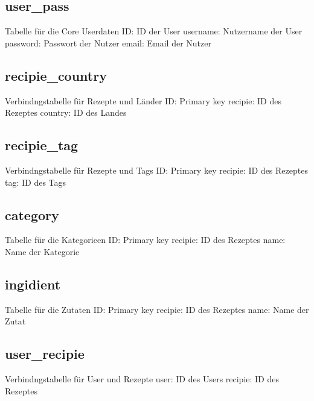 \documentclass{article}
\begin{document}
\subsection{user\_pass}
Tabelle für die Core Userdaten
\newline
ID: ID der User
\newline
username: Nutzername der User
\newline
password: Passwort der Nutzer
\newline
email: Email der Nutzer

\subsection{recipie\_country}
Verbindngstabelle für Rezepte und Länder
\newline
ID: Primary key
\newline
recipie: ID des Rezeptes
\newline
country: ID des Landes

\subsection{recipie\_tag}
Verbindngstabelle für Rezepte und Tags
\newline
ID: Primary key
\newline
recipie: ID des Rezeptes
\newline
tag: ID des Tags

\subsection{category}
Tabelle für die Kategorieen
\newline
ID: Primary key
\newline
recipie: ID des Rezeptes
\newline
name: Name der Kategorie

\subsection{ingidient}
Tabelle für die Zutaten
\newline
ID: Primary key
\newline
recipie: ID des Rezeptes
\newline
name: Name der Zutat

\subsection{user\_recipie}
Verbindngstabelle für User und Rezepte
\newline
user: ID des Users
\newline
recipie: ID des Rezeptes
\end{document}
